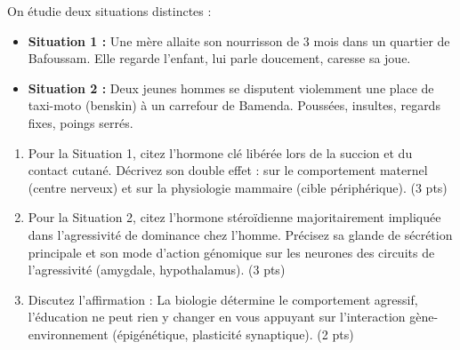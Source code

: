 \documentclass[11pt]{article}
\begin{document}
\begin{exercice}
\label{exo:hormones}
On étudie deux situations distinctes :
\begin{itemize}
    \item \textbf{Situation 1 :} Une mère allaite son nourrisson de 3 mois dans un quartier de Bafoussam. Elle regarde l'enfant, lui parle doucement, caresse sa joue.
    \item \textbf{Situation 2 :} Deux jeunes hommes se disputent violemment une place de taxi-moto (\og\thinspace{}benskin\thinspace{}\fg{}) à un carrefour de Bamenda. Poussées, insultes, regards fixes, poings serrés.
\end{itemize}
\begin{enumerate}
    \item Pour la Situation 1, citez l'hormone clé libérée lors de la succion et du contact cutané. Décrivez son double effet : sur le comportement maternel (centre nerveux) et sur la physiologie mammaire (cible périphérique). \hfill (3 pts)
    \item Pour la Situation 2, citez l'hormone stéroïdienne majoritairement impliquée dans l'agressivité de dominance chez l'homme. Précisez sa glande de sécrétion principale et son mode d'action génomique sur les neurones des circuits de l'agressivité (amygdale, hypothalamus). \hfill (3 pts)
    \item Discutez l'affirmation : \og\thinspace{}La biologie détermine le comportement agressif, l'éducation ne peut rien y changer\thinspace{}\fg{} en vous appuyant sur l'interaction gène-environnement (épigénétique, plasticité synaptique). \hfill (2 pts)
\end{enumerate}
\end{exercice}
\end{document}
